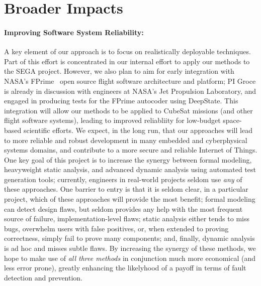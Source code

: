 \section{Broader Impacts}

\paragraph{Improving Software System Reliability:} A key element of
our approach is to focus on realistically deployable techniques.  Part
of this effort is concentrated in our internal effort to apply our
methods to the SEGA project.  However, we also plan
to aim for early integration with NASA's FPrime~\cite{fprime,fprimerepo}
open source
flight software architecture and platform; PI Groce is already in
discussion with engineers at NASA's Jet Propulsion Laboratory, and
engaged in producing tests for the FPrime autocoder using DeepState.
This integration will allow our
methods to be applied to CubeSat missions (and other flight software
systems), leading to improved reliabliity for low-budget space-based
scientific efforts.  We expect, in the long run, that our approaches
will lead to more reliable and robust development in many embedded and
cyberphysical systems domains, and contribute to a more secure and
reliable Internet of Things.  One key goal of this project is to
increase the synergy between formal modeling, heavyweight static
analysis, and advanced dynamic analysis using automated test
generation tools; currently, engineers in real-world projects seldom
use \emph{any} of these approaches.  One barrier to entry is that it
is seldom clear, in a particular project, which of these approaches
will provide the most benefit; formal modeling can detect design
flaws, but seldom provides any help with the most frequent source of
failure, implementation-level flaws; static analysis either tends to
miss bugs, overwhelm users with false positives, or, when extended to
proving correctness, simply fail to prove many components; and,
finally, dynamic analysis is ad hoc and misses subtle flaws.  By
increasing the synergy of these methods, we hope to make use of
\emph{all three methods} in conjunction much more economical (and less
error prone), greatly enhancing the likelyhood of a
payoff in terms of fault detection and prevention.

